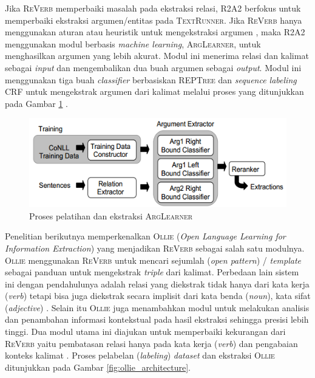 Jika \textsc{ReVerb} memperbaiki masalah pada ekstraksi relasi, \textsc{R2A2} berfokus untuk memperbaiki ekstraksi argumen/entitas \citep{etzioni2011open} pada \textsc{TextRunner}. Jika \textsc{ReVerb} hanya menggunakan aturan atau heuristik untuk mengekstraksi argumen \citep{fader2011identifying}, maka \textsc{R2A2} menggunakan modul berbasis \textit{machine learning}, \textsc{ArgLearner}, untuk menghasilkan argumen yang lebih akurat. Modul ini menerima relasi dan kalimat sebagai \textit{input} dan mengembalikan dua buah argumen sebagai \textit{output}. Modul ini menggunakan tiga buah \textit{classifier} berbasiskan \textsc{REPTree} \citep{hall2009weka} dan \textit{sequence labeling} CRF \citep{mccallum2002mallet} untuk mengekstrak argumen dari kalimat melalui proses yang ditunjukkan pada Gambar \ref{fig:arglearner_architecture} \citep{etzioni2011open}.

\begin{figure}
	\centering
	\includegraphics[scale=0.5]{../images/arglearner_architecture.png}
	\caption{Proses pelatihan dan ekstraksi \textsc{ArgLearner}}
	\label{fig:arglearner_architecture}
\end{figure}

Penelitian berikutnya memperkenalkan \textsc{Ollie} (\textit{Open Language Learning for Information Extraction}) \citep{schmitz2012open} yang menjadikan \textsc{ReVerb} sebagai salah satu modulnya. \textsc{Ollie} menggunakan \textsc{ReVerb} untuk mencari sejumlah (\textit{open pattern}) / \textit{template} sebagai panduan untuk mengekstrak \textit{triple} dari kalimat. Perbedaan lain sistem ini dengan pendahulunya adalah relasi yang diekstrak tidak hanya dari kata kerja (\textit{verb}) tetapi bisa juga diekstrak secara implisit dari kata benda (\textit{noun}), kata sifat (\textit{adjective}) \citep{schmitz2012open}. Selain itu \textsc{Ollie} juga menambahkan modul untuk melakukan analisis dan penambahan informasi kontekstual pada hasil ekstraksi sehingga presisi lebih tinggi. Dua modul utama ini diajukan untuk memperbaiki kekurangan dari \textsc{ReVerb} yaitu pembatasan relasi hanya pada kata kerja (\textit{verb}) dan pengabaian konteks kalimat \citep{schmitz2012open}. Proses pelabelan (\textit{labeling}) \textit{dataset} dan ekstraksi \textsc{Ollie} ditunjukkan pada Gambar \ref{fig:ollie_architecture}.

